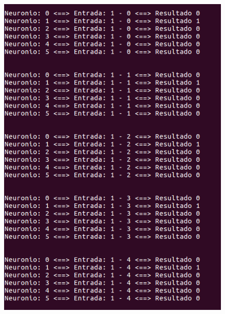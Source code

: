 \documentclass[hidelinks,12pt]{article}
\begin{document}
		\begin{figure}[!h]
			\centering
			\includegraphics[scale=0.5]{Figures/E3S1P1.png}
		\end{figure}
		
\end{document}
